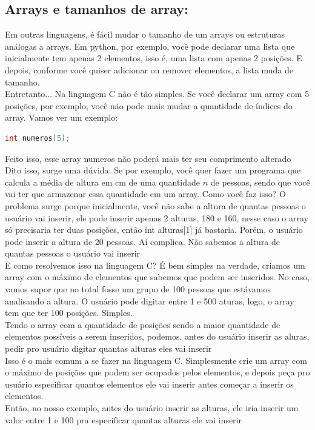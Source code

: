 \documentclass{article}
\begin{document}
\subsection{Arrays e tamanhos de array:} Em outras linguagens, é fácil mudar o tamanho de um arrays ou estruturas análogas a arrays. Em python, por exemplo, você pode declarar uma lista que inicialmente tem apenas 2 elementos, isso é, uma lista com apenas 2 posições. E depois, conforme você quiser adicionar ou remover elementos, a lista muda de tamanho.
\\[5pt]
Entretanto... Na linguagem C não é tão simples. Se você declarar um array com 5 posições, por exemplo, você não pode mais mudar a quantidade de índices do array. Vamos ver um exemplo:
\begin{lstlisting}[language=C]
    int numeros[5];
\end{lstlisting}
Feito isso, esse array numeros não poderá mais ter seu comprimento alterado
\\[5pt]
Dito isso, surge uma dúvida: Se por exemplo, você quer fazer um programa que calcula a média de altura em cm de uma quantidade $n$ de pessoas, sendo que você vai ter que armazenar essa quantidade em um array. Como você faz isso? O problema surge porque inicialmente, você não sabe a altura de quantas pessoas o usuário vai inserir, ele pode inserir apenas 2 alturas, 180 e 160, nesse caso o array só precisaria ter duas posições, então int alturas[1] já bastaria. Porém, o usuário pode inserir a altura de 20 pessoas. Aí complica. Não sabemos a altura de quantas pessoas o usuário vai inserir
\\[5pt]
E como resolvemos isso na linguagem C? É bem simples na verdade, criamos um array com o máximo de elementos que sabemos que podem ser inseridos. No caso, vamos supor que no total fosse um grupo de 100 pessoas que estávamos analisando a altura. O usuário pode digitar entre 1 e 500 aturas, logo, o array tem que ter 100 posições. Simples.
\\[5pt]
Tendo o array com a quantidade de posições sendo a maior quantidade de elementos possíveis a serem inseridos, podemos, antes do usuário inserir as aluras, pedir pro usuário digitar quantas alturas eles vai inserir
\\
Isso é o mais comum a se fazer na linguagem C. Simplesmente crie um array com o máximo de posições que podem ser ocupados pelos elementos, e depois peça pro usuário especificar quantos elementos ele vai inserir antes começar a inserir os elementos.
\\
Então, no nosso exemplo, antes do usuário inserir as alturas, ele iria inserir um valor entre 1 e 100 pra especificar quantas alturas ele vai inserir
\end{document}
